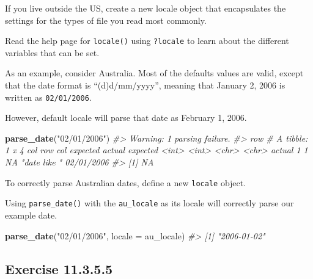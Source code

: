 \documentclass[]{book}
\newenvironment{Shaded}{\begin{snugshade}}{\end{snugshade}}
\newcommand{\CommentTok}[1]{\textcolor[rgb]{0.56,0.35,0.01}{\textit{#1}}}
\newcommand{\DataTypeTok}[1]{\textcolor[rgb]{0.13,0.29,0.53}{#1}}
\newcommand{\KeywordTok}[1]{\textcolor[rgb]{0.13,0.29,0.53}{\textbf{#1}}}
\newcommand{\NormalTok}[1]{#1}
\newcommand{\StringTok}[1]{\textcolor[rgb]{0.31,0.60,0.02}{#1}}
\theoremstyle{plain}
\theoremstyle{remark}
\begin{document}
If you live outside the US, create a new locale object that encapsulates
the settings for the types of file you read most commonly.

Read the help page for \texttt{locale()} using \texttt{?locale} to learn
about the different variables that can be set.

As an example, consider Australia. Most of the defaults values are
valid, except that the date format is ``(d)d/mm/yyyy'', meaning that
January 2, 2006 is written as \texttt{02/01/2006}.

However, default locale will parse that date as February 1, 2006.

\begin{Shaded}
\begin{Highlighting}[]
\KeywordTok{parse_date}\NormalTok{(}\StringTok{"02/01/2006"}\NormalTok{)}
\CommentTok{#> Warning: 1 parsing failure.}
\CommentTok{#> row # A tibble: 1 x 4 col     row   col expected     actual     expected   <int> <int> <chr>        <chr>      actual 1     1    NA "date like " 02/01/2006}
\CommentTok{#> [1] NA}
\end{Highlighting}
\end{Shaded}

To correctly parse Australian dates, define a new \texttt{locale}
object.

\begin{Shaded}
\end{Shaded}

Using \texttt{parse\_date()} with the \texttt{au\_locale} as its locale
will correctly parse our example date.

\begin{Shaded}
\begin{Highlighting}[]
\KeywordTok{parse_date}\NormalTok{(}\StringTok{"02/01/2006"}\NormalTok{, }\DataTypeTok{locale =}\NormalTok{ au_locale)}
\CommentTok{#> [1] "2006-01-02"}
\end{Highlighting}
\end{Shaded}

\hypertarget{exercise-11.3.5.5}{%
\subsection*{\texorpdfstring{Exercise
{11.3.5.5}}{Exercise 11.3.5.5}}\label{exercise-11.3.5.5}}
\end{document}
